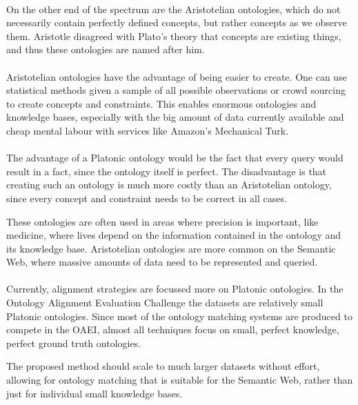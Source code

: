 \documentclass{article}
\begin{document}
 \paragraph{}
 On the other end of the spectrum are the Aristotelian ontologies, which do not necessarily contain perfectly defined concepts, but rather concepts as we observe them. Aristotle disagreed with Plato's theory that concepts are existing things, and thus these ontologies are named after him\cite{aristotleplato}.
 \paragraph{}
 Aristotelian ontologies have the advantage of being easier to create. One can use statistical methods given a sample of all possible observations or crowd sourcing to create concepts and constraints. This enables enormous ontologies and knowledge bases, especially with the big amount of data currently available and cheap mental labour with services like Amazon's Mechanical Turk.
 \paragraph{}
 The advantage of a Platonic ontology would be the fact that every query would result in a fact, since the ontology itself is perfect. The disadvantage is that creating such an ontology is much more costly than an Aristotelian ontology, since every concept and constraint needs to be correct in all cases. 
 
 These ontologies are often used in areas where precision is important, like medicine, where lives depend on the information contained in the ontology and its knowledge base. Aristotelian ontologies are more common on the Semantic Web, where massive amounts of data need to be represented and queried.
 \paragraph{}
 Currently, alignment strategies are focussed more on Platonic ontologies. In the Ontology Alignment Evaluation Challenge the datasets are relatively small Platonic ontologies. Since most of the ontology matching systems are produced to compete in the OAEI, almost all techniques focus on small, perfect knowledge, perfect ground truth ontologies.
 
 The proposed method should scale to much larger datasets without effort, allowing for ontology matching that is suitable for the Semantic Web, rather than just for individual small knowledge bases.
 
\end{document}
